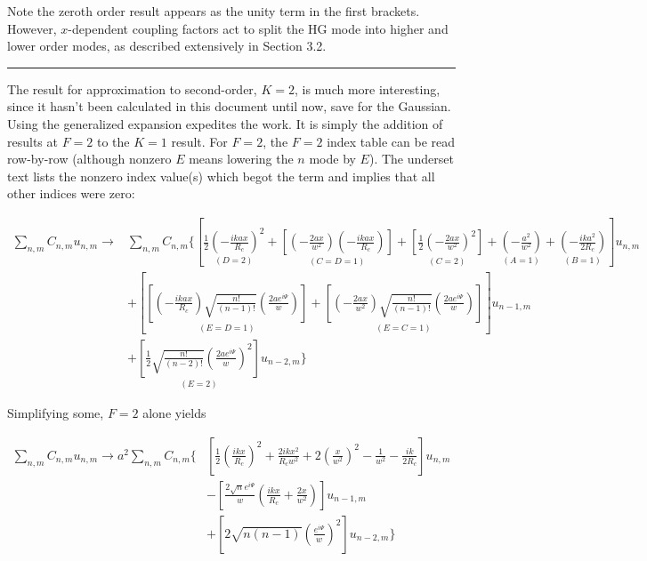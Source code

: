 \documentclass[aps,twoside,secnumarabic,balancelastpage,amsmath,amssymb,nofootinbib,hyperref=pdftex]{revtex4}
\begin{document}
Note the zeroth order result appears as the unity term in the first brackets. However, $x$-dependent coupling factors act to split the HG mode into higher and lower order modes, as described extensively in Section 3.2.

\rule{\textwidth}{0.4pt}

The result for approximation to second-order, $K=2$, is much more interesting, since it hasn't been calculated in this document until now, save for the Gaussian. Using the generalized expansion expedites the work. It is simply the addition of results at $F=2$ to the $K=1$ result. For $F=2$, the $F=2$ index table can be read row-by-row (although nonzero $E$ means lowering the $n$ mode by $E$). The underset text lists the nonzero index value(s) which begot the term and implies that all other indices were zero:

\begin{align*}
\sum_{n,m} C_{n,m} u_{n,m}
\rightarrow &
\sum_{n,m} 
C_{n,m}
\lbrace
\left[
\underset{ (D=2)}
{
	\frac{1}{2}
	(-\frac{ikax}{R_c})^2
	}	
+
\underset{ (C=D=1)}
{
[
	(-\frac{2ax}{w^2})
	(-\frac{ikax}{R_c})
]
}
+
\underset{ (C=2)}
{
[
	\frac{1}{2}(-\frac{2ax}{w^2})^2
]
}
+
\underset{ (A=1)}
{
	(-\frac{a^2}{w^2})
	}
+
\underset{ (B=1)}
{
	(-\frac{ika^2}{2R_c})
	}
\right]
u_{n,m}
\\&
+
\left[
\underset{ (E=D=1)}
{
\left[
		(-\frac{ikax}{R_c})
		\sqrt{\frac{n!}{(n-1)!}}
		(
		 \frac{2 a e^{i\Psi}}{w}
		)
\right]
}
+
\underset{ (E=C=1)}
{
\left[
		(-\frac{2ax}{w^2})
		\sqrt{\frac{n!}{(n-1)!}}
		(
		 \frac{2 a e^{i\Psi}}{w}
		)
\right]
}
\right]
u_{n-1,m}
\\&+
\underset{ (E=2)}
{
\left[	
		\frac{1}{2}
		\sqrt{\frac{n!}{(n-2)!}}
		(
		 \frac{2 a e^{i\Psi}}{w}
		)^2
\right]
}
u_{n-2,m}
\rbrace
\end{align*}

Simplifying some, $F=2$ alone yields

\begin{align*}
\sum_{n,m} C_{n,m} u_{n,m}
\rightarrow
a^2
\sum_{n,m} 
C_{n,m}
\lbrace &
\left[
	\frac{1}{2}
	(\frac{ikx}{R_c})^2
+
	\frac{2ikx^2}{ R_c w^2}
+
	2(\frac{x}{w^2})^2
-
	\frac{1}{w^2}
-
	\frac{ik}{2R_c}
\right]
u_{n,m}
\\&
-
\left[
		 \frac{2 \sqrt{n} e^{i\Psi}}{w}
(		
		\frac{ikx}{R_c}
+
		\frac{2x}{w^2}
		)
\right]
u_{n-1,m}
\\&+
\left[	
		2
		\sqrt{n(n-1)}
		(
		 \frac{e^{i\Psi}}{w}
		)^2
\right]
u_{n-2,m}
\rbrace
\end{align*}
\end{document}

